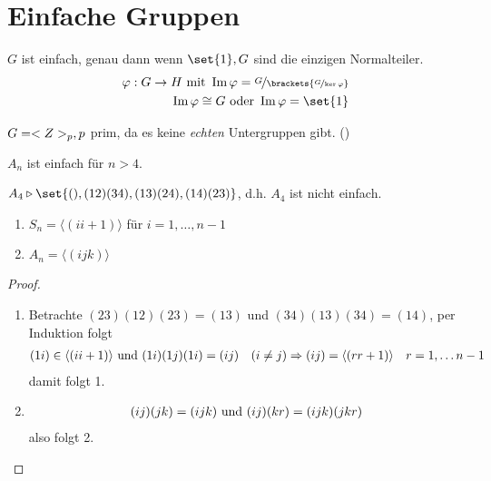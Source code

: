 \section{Einfache Gruppen}
\begin{definition}
	$G$ ist einfach, genau dann wenn $\set{1}, G$ sind die einzigen Normalteiler.
	\begin{align*}
		\phi: G \to H \mit \Image \phi = \lnkset{G}{\brackets{\lnkset{G}{\ker \phi}}}\\
		\Image \phi \cong G \oder \Image \phi = \set{1}
	\end{align*}
\end{definition}
\begin{*example}
	$G = <Z>_p,p$ prim, da es keine \emph{echten} Untergruppen gibt. ()
\end{*example}
\begin{proposition}
	\label{prop_a_n_simple}
	$A_n$ ist einfach für $n > 4$.
\end{proposition}
\begin{*remark}
	$A_4 \rhd \set{(), (12)(34),(13)(24),(14)(23)}$, d.h. $A_4$ ist nicht einfach.
\end{*remark}
\begin{lemma}
	\begin{enumerate}
		\item $S_n = \langle (i i+1)\rangle$ für $i = 1, \dots, n -1$
		\item $A_n = \langle (ijk) \rangle$
	\end{enumerate}
\end{lemma}
\begin{proof}
	\begin{enumerate}
		\item 	Betrachte $(23)(12)(23) = (13)$ und $(34)(13)(34) = (14)$, per Induktion folgt 
		\begin{align*}
		(1i) \in \langle (i i+1)\rangle \text{ und } (1i)(1j)(1i) = (ij) \quad (i \neq j)
		\Rightarrow (ij) = \langle (r r+1) \rangle \quad r = 1,\dots n-1
		\end{align*}
		damit folgt 1.
		\item 
		\begin{align*}
			(ij)(jk) = (ijk) \text{ und } (ij)(kr) = (ijk)(jkr)
		\end{align*}
		also folgt 2.
	\end{enumerate}
\end{proof}
